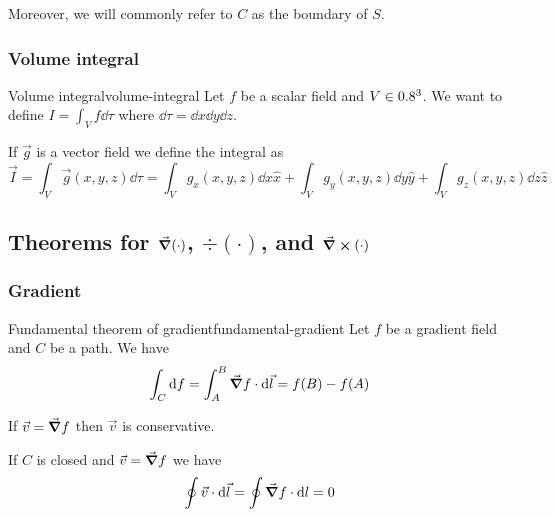\documentclass[12pt]{extarticle}
\begin{document}
Moreover, we will commonly refer to $C$ as the boundary of $S$.

\subsubsection{Volume integral}

\begin{definition}{Volume integral}{volume-integral}
    Let $f$ be a scalar field and $V \in 0.8^3$.
    We want to define $I = \int_V f \dd{\tau}$ where $\dd{\tau} = \dd{x} \dd{y} \dd{z}$.

    If $\vec g$ is a vector field we define the integral as
    \begin{equation}
        \vec I = \int_V \vec g(x, y, z) \dd{\tau} = \int_V g_x (x, y, z) \dd{x} \hat x + \int_V g_y (x, y, z) \dd{y} \hat y + \int_V g_z (x, y, z) \dd{z} \hat z
    \end{equation}
\end{definition}

\subsection{Theorems for \texorpdfstring{$\grad(\mathord{\cdot})$, $\div(\mathord{\cdot})$, and $\curl(\mathord{\cdot}) $}{gradient, divergence and curl}}

\subsubsection{Gradient}

\begin{theorem}{Fundamental theorem of gradient}{fundamental-gradient}
    Let $f$ be a gradient field and $C$ be a path. We have
    \begin{equation}
        \int_C \dd{f} = \int_A^B \grad f \cdot \dd{\vec l} = f(B)- f(A)
    \end{equation}
\end{theorem}

\begin{corollary}{}{}
    If $\vec v = \grad f$ then $\vec v$ is conservative.
\end{corollary}

\begin{corollary}{}{}
    If $C$ is closed and $\vec v = \grad f$ we have
    \begin{equation}
        \oint \vec v \cdot \dd{\vec l} = \oint \grad f \cdot \dd{l} = 0
    \end{equation}
\end{corollary}
\end{document}

